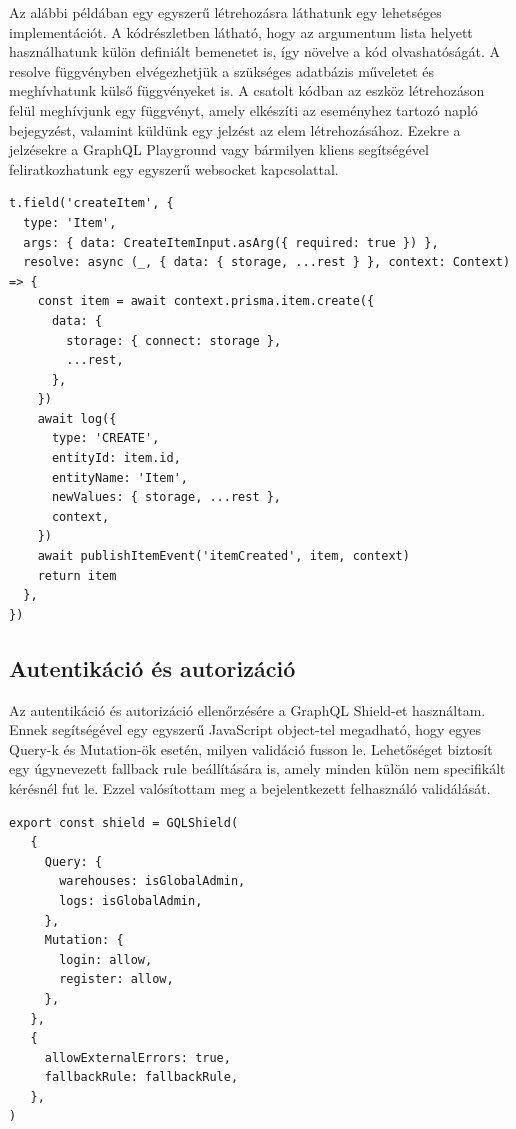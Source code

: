 Az alábbi példában egy egyszerű létrehozásra láthatunk egy lehetséges implementációt.
A kódrészletben látható, hogy az argumentum lista helyett használhatunk külön definiált bemenetet is, így növelve a kód olvashatóságát.
A resolve függvényben elvégezhetjük a szükséges adatbázis műveletet és meghívhatunk külső függvényeket is.
A csatolt kódban az eszköz létrehozáson felül meghívjunk egy függvényt, amely elkészíti az eseményhez tartozó napló bejegyzést, valamint küldünk egy jelzést az elem létrehozásához.
Ezekre a jelzésekre a GraphQL Playground vagy bármilyen kliens segítségével feliratkozhatunk egy egyszerű websocket kapcsolattal.

\begin{lstlisting}[style=ES6, caption={Eszköz létrehozás resolver}]
t.field('createItem', {
  type: 'Item',
  args: { data: CreateItemInput.asArg({ required: true }) },
  resolve: async (_, { data: { storage, ...rest } }, context: Context) => {
    const item = await context.prisma.item.create({
      data: {
        storage: { connect: storage },
        ...rest,
      },
    })
    await log({
      type: 'CREATE',
      entityId: item.id,
      entityName: 'Item',
      newValues: { storage, ...rest },
      context,
    })
    await publishItemEvent('itemCreated', item, context)
    return item
  },
})
\end{lstlisting}

\subsection{Autentikáció és autorizáció}
Az autentikáció és autorizáció ellenőrzésére a GraphQL Shield-et használtam. 
Ennek segítségével egy egyszerű JavaScript object-tel megadható, hogy egyes Query-k és Mutation-ök esetén, milyen validáció fusson le.
Lehetőséget biztosít egy úgynevezett fallback rule beállítására is, amely minden külön nem specifikált kérésnél fut le.
Ezzel valósítottam meg a bejelentkezett felhasználó validálását.

\begin{lstlisting}[style=ES6, caption={GraphQL Shield}]
export const shield = GQLShield(
   {
     Query: {
       warehouses: isGlobalAdmin,
       logs: isGlobalAdmin,
     },
     Mutation: {
       login: allow,
       register: allow,
     },
   },
   {
     allowExternalErrors: true,
     fallbackRule: fallbackRule,
   },
)
\end{lstlisting}

